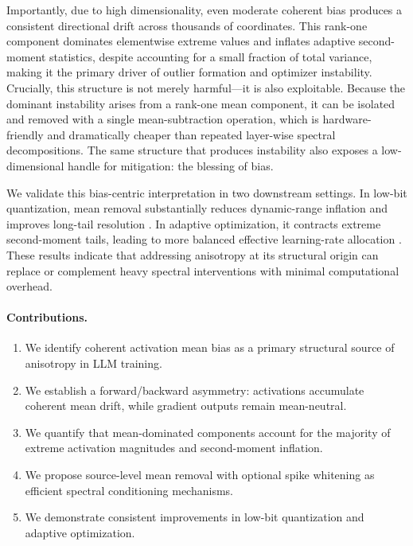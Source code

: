 Importantly, due to high dimensionality, even moderate coherent bias produces a consistent directional drift across thousands of coordinates. This rank-one component dominates elementwise extreme values and inflates adaptive second-moment statistics, despite accounting for a small fraction of total variance, making it the primary driver of outlier formation and optimizer instability. Crucially, this structure is not merely harmful---it is also exploitable. Because the dominant instability arises from a rank-one mean component, it can be isolated and removed with a single mean-subtraction operation, which is hardware-friendly and dramatically cheaper than repeated layer-wise spectral decompositions. The same structure that produces instability also exposes a low-dimensional handle for mitigation: the blessing of bias.

We validate this bias-centric interpretation in two downstream settings. 
In low-bit quantization, mean removal substantially reduces dynamic-range inflation and improves long-tail resolution 
\citep{xiao2023smoothquant, wei2023outlier, ashkboos2024quarot, cao2025metis}. 
In adaptive optimization, it contracts extreme second-moment tails, leading to more balanced effective learning-rate allocation 
\citep{kingma2014adam, spectra2026}. 
These results indicate that addressing anisotropy at its structural origin can replace or complement heavy spectral interventions with minimal computational overhead.

\paragraph{Contributions.}
\begin{enumerate}
    \item We identify coherent activation mean bias as a primary structural source of anisotropy in LLM training.
    \item We establish a forward/backward asymmetry: activations accumulate coherent mean drift, while gradient outputs remain mean-neutral.
    \item We quantify that mean-dominated components account for the majority of extreme activation magnitudes and second-moment inflation.
    \item We propose source-level mean removal with optional spike whitening as efficient spectral conditioning mechanisms.
    \item We demonstrate consistent improvements in low-bit quantization and adaptive optimization.
\end{enumerate}
